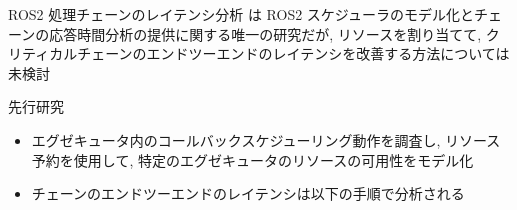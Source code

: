 \begin{frame}{ROS2 処理チェーンのレイテンシ分析}
    \cite{casini2019response} は ROS2 スケジューラのモデル化とチェーンの応答時間分析の提供に関する唯一の研究だが, リソースを割り当てて, クリティカルチェーンのエンドツーエンドのレイテンシを改善する方法については未検討
    \begin{block}{先行研究 \cite{casini2019response}}
        \setlength{\linewidth}{0.98\columnwidth}
        \setlength{\wideitemsep}{0.8\itemsep}
        {\footnotesize
            \begin{itemize}
                \item エグゼキュータ内のコールバックスケジューリング動作を調査し, リソース予約を使用して, 特定のエグゼキュータのリソースの可用性をモデル化
                \item チェーンのエンドツーエンドのレイテンシは以下の手順で分析される
            \end{itemize}
        }
    \end{block}
\end{frame}

